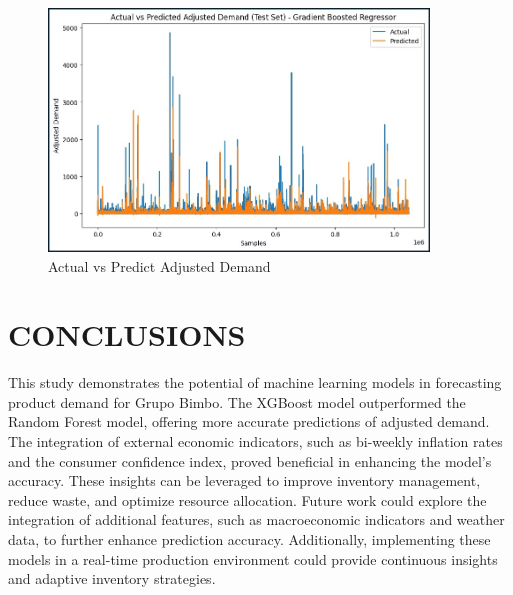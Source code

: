 \documentclass[letterpaper, 10 pt, conference]{ieeeconf}  %
\begin{document}
\begin{figure}[H] 
        \begin{center}
        \centering
        \includegraphics[width=0.9\textwidth]{images/comparisonxg.jpg}
        \caption{Actual vs Predict Adjusted Demand}
        \end{center}
\end{figure} 


\section{CONCLUSIONS}

This study demonstrates the potential of machine learning models in forecasting product demand for Grupo Bimbo. The XGBoost model outperformed the Random Forest model, offering more accurate predictions of adjusted demand. The integration of external economic indicators, such as bi-weekly inflation rates and the consumer confidence index, proved beneficial in enhancing the model's accuracy. These insights can be leveraged to improve inventory management, reduce waste, and optimize resource allocation. Future work could explore the integration of additional features, such as macroeconomic indicators and weather data, to further enhance prediction accuracy. Additionally, implementing these models in a real-time production environment could provide continuous insights and adaptive inventory strategies.


\addtolength{\textheight}{-12cm}   %
\end{document}
